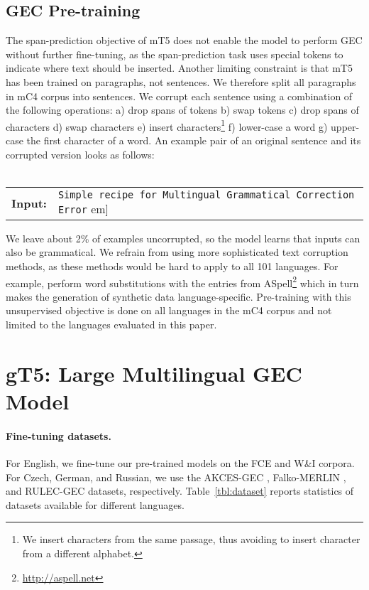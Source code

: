 \documentclass[11pt,a4paper]{article}
\newcommand{\GT}[0]{{gT5}\xspace}
\begin{document}
\subsection{GEC Pre-training}\label{gec-pre-training}
The span-prediction objective of mT5 does not enable the model to perform GEC without further fine-tuning, as the span-prediction task uses  special  tokens  to  indicate  where  text should be inserted.
Another limiting constraint is that  mT5 has  been trained on paragraphs, not sentences.
We therefore split all paragraphs in mC4 corpus into sentences.
We corrupt each sentence using a combination of the following operations:
a) drop spans of tokens b) swap tokens c) drop spans of characters d) swap characters e) insert characters\footnote{We insert characters from the same passage, thus avoiding to insert character from a different alphabet.} f) lower-case a word g) upper-case the first character of a word.
An example pair of an original sentence and its corrupted version looks as follows: \\
\\
{\footnotesize
\setlength{\parindent}{3pt}
\begin{tabularx}{\columnwidth}{lX}
\textbf{Input:} &
\texttt{Simple recipe for Multingual Grammatical Correction Error} \1em]
\end{tabularx}
}

{\setlength{\parindent}{0pt}
We leave about 2\% of examples uncorrupted, so the model learns that inputs can also be grammatical.}
We refrain from using more sophisticated text corruption methods, as these methods would be hard to apply to all 101 languages.
For example, \citet{naplava} perform word substitutions with the entries from ASpell\footnote{\url{http://aspell.net}} which in turn makes the generation of synthetic data language-specific.
Pre-training with this unsupervised objective is done on all languages in the mC4 corpus and not limited to the languages evaluated in this paper.

\section{\GT: Large Multilingual GEC Model} 
\paragraph*{Fine-tuning datasets.}\label{fine-tuning-data}
For English, we fine-tune our pre-trained models on the FCE \citep{fcedataset} and W\&I \citep{bea-2019} corpora.
For Czech, German, and Russian, we use the AKCES-GEC \citep{naplava}, Falko-MERLIN \citep{boyd-2018}, and RULEC-GEC \citep{rozovskaya-roth-2019-grammar} datasets, respectively. Table~\ref{tbl:dataset} reports statistics of datasets available for different languages.
\end{document}

